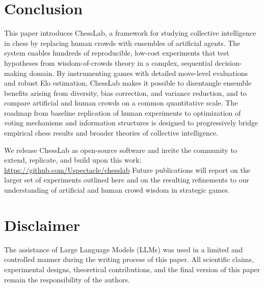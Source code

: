 \documentclass[format=acmsmall, review=false]{acmart}
\begin{document}
\section{Conclusion}

This paper introduces ChessLab, a framework for studying collective intelligence in chess by replacing human crowds with ensembles of artificial agents.
The system enables hundreds of reproducible, low-cost experiments that test hypotheses from wisdom-of-crowds theory in a complex, sequential decision-making domain.
By instrumenting games with detailed move-level evaluations and robust Elo estimation, ChessLab makes it possible to disentangle ensemble benefits arising from diversity, bias correction, and variance reduction, and to compare artificial and human crowds on a common quantitative scale.
The roadmap from baseline replication of human experiments to optimization of voting mechanisms and information structures is designed to progressively bridge empirical chess results and broader theories of collective intelligence.

We release ChessLab as open-source software and invite the community to extend, replicate, and build upon this work: \url{https://github.com/Uspectacle/chesslab}
Future publications will report on the larger set of experiments outlined here and on the resulting refinements to our understanding of artificial and human crowd wisdom in strategic games.

\section*{Disclaimer}

The assistance of Large Language Models (LLMs) was used in a limited and controlled manner during the writing process of this paper.
All scientific claims, experimental designs, theoretical contributions, and the final version of this paper remain the responsibility of the authors.



\end{document}
